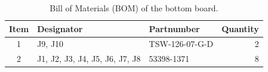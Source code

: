 \begin{table}[!h]
    \centering
    \begin{tabular}{cllr}
        \toprule[1.5pt]
        \textbf{Item}   & \textbf{Designator}            & \textbf{Partnumber} & \textbf{Quantity} \\
        \midrule
        1               & J9, J10                        & TSW-126-07-G-D      & 2                 \\
        2               & J1, J2, J3, J4, J5, J6, J7, J8 & 53398-1371          & 8                 \\
        \bottomrule[1.5pt]
    \end{tabular}
    \caption{Bill of Materials (BOM) of the bottom board.}
    \label{tab:bom-bottom-board}
\end{table}

